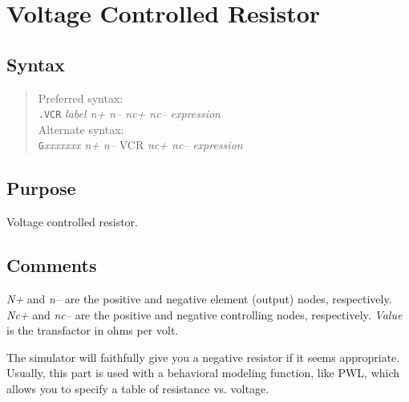 %
%
%
%
\section{Voltage Controlled Resistor}
\subsection{Syntax}
\begin{verse}
Preferred syntax:\\
{\tt .VCR} {\it label n+ n-- nc+ nc--} {\it expression}\\
Alternate syntax:\\
{\tt G}{\it xxxxxxx n+ n--} VCR {\it nc+ nc--} {\it expression}
\end{verse}
\subsection{Purpose}

Voltage controlled resistor.
\subsection{Comments}

{\it N+} and {\it n--} are the positive and negative element (output) nodes,
respectively.  {\it Nc+} and {\it nc--} are the positive and negative
controlling nodes, respectively.  {\it Value} is the transfactor in
ohms per volt.

The simulator will faithfully give you a negative resistor if it
seems appropriate.  Usually, this part is used with a behavioral
modeling function, like PWL, which allows you to specify a table of
resistance vs. voltage.
